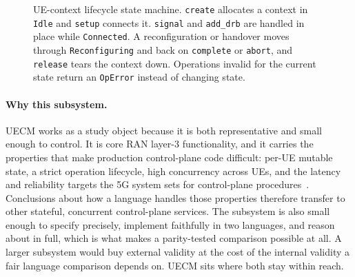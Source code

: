 \documentclass[english,oneside,a4paper,censored,csm,software-track-2020]{HYthesisML}
\begin{document}
\begin{figure}[ht]
\centering
{}
\caption[UE-context lifecycle state machine]{UE-context lifecycle state machine. \texttt{create} allocates a context in
\texttt{Idle} and \texttt{setup} connects it. \texttt{signal} and \texttt{add\_drb} are handled
in place while \texttt{Connected}. A reconfiguration or handover moves through
\texttt{Reconfiguring} and back on \texttt{complete} or \texttt{abort}, and \texttt{release}
tears the context down. Operations invalid for the current state return an \texttt{OpError}
instead of changing state.\label{fig:fsm}}
\end{figure}

\paragraph{Why this subsystem.}
UECM works as a study object because it is both representative and small enough to control. It
is core RAN layer-3 functionality, and it carries the properties that make production
control-plane code difficult: per-UE mutable state, a strict operation lifecycle, high
concurrency across UEs, and the latency and reliability targets the 5G system sets for
control-plane procedures~\cite{3gpp38913,3gpp22261}. Conclusions about how a language handles
those properties therefore transfer to other stateful, concurrent control-plane services. The
subsystem is also small enough to specify precisely, implement faithfully in two languages, and
reason about in full, which is what makes a parity-tested comparison possible at all. A larger
subsystem would buy external validity at the cost of the internal validity a fair language
comparison depends on. UECM sits where both stay within reach.
\end{document}
